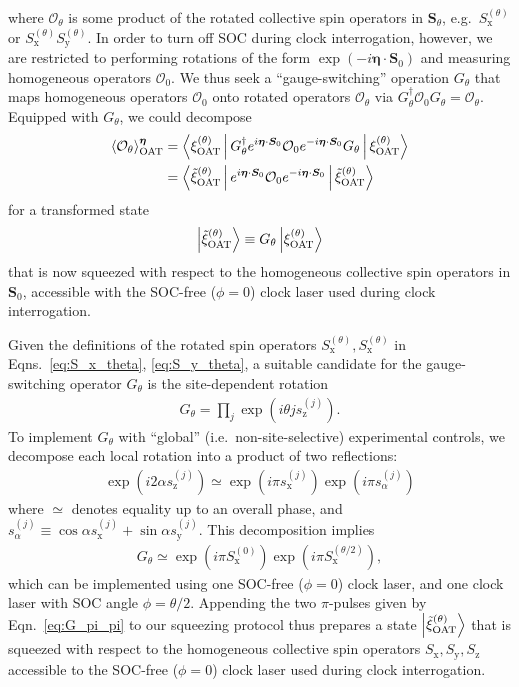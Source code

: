 \documentclass[aps,prx,superscriptaddress,notitlepage,twocolumn,longbibliography]{revtex4-1}
\renewcommand{\t}{\text} %
\newcommand{\p}[1]{\left(#1\right)} %
\renewcommand{\c}{\cdot} %
\renewcommand{\v}{\bm} %
\newcommand{\bk}{\Braket}
\renewcommand{\ket}{\Ket}
\renewcommand{\O}{\mathcal{O}}
\newcommand{\z}{\text{z}}
\newcommand{\x}{\text{x}}
\newcommand{\y}{\text{y}}
\begin{document}
where $\O_\theta$ is some product of the rotated collective spin operators in $\v S_\theta$, e.g.~$S_\x^{(\theta)}$ or $S_\x^{(\theta)} S_\y^{(\theta)}$.
In order to turn off SOC during clock interrogation, however, we are restricted to performing rotations of the form $\exp\p{-i\v\eta\c\v S_0}$ and measuring homogeneous operators $\O_0$.
We thus seek a ``gauge-switching'' operation $G_\theta$ that maps homogeneous operators $\O_0$ onto rotated operators $\O_\theta$ via $G_\theta^\dag \O_0 G_\theta = \O_\theta$.
Equipped with $G_\theta$, we could decompose
\begin{align}
  \bk{\O_\theta}_{\t{OAT}}^{\v\eta}
  &= \bk{\xi_{\t{OAT}}^{(\theta)}| G_\theta^\dag e^{i\v\eta\c\v S_0}
    \O_0 e^{-i\v\eta\c\v S_0} G_\theta |\xi_{\t{OAT}}^{(\theta)}}
  \notag \\
  &= \bk{\tilde \xi_{\t{OAT}}^{(\theta)}| e^{i\v\eta\c\v S_0}
    \O_0 e^{-i\v\eta\c\v S_0} |\tilde \xi_{\t{OAT}}^{(\theta)}}
\end{align}
for a transformed state
\begin{align}
  \ket{\tilde \xi_{\t{OAT}}^{(\theta)}}
  \equiv G_\theta \ket{\xi_{\t{OAT}}^{(\theta)}}
\end{align}
that is now squeezed with respect to the homogeneous collective spin operators in $\v S_0$, accessible with the SOC-free ($\phi=0$) clock laser used during clock interrogation.

Given the definitions of the rotated spin operators $S_\x^{(\theta)},S_\x^{(\theta)}$ in Eqns.~\eqref{eq:S_x_theta}, \eqref{eq:S_y_theta}, a suitable candidate for the gauge-switching operator $G_\theta$ is the site-dependent rotation
\begin{align}
  G_\theta = \prod_j \exp\p{i\theta j s_\z^{(j)}}.
\end{align}
To implement $G_\theta$ with ``global'' (i.e.~non-site-selective) experimental controls, we decompose each local rotation into a product of two reflections:
\begin{align}
  \exp\p{i2\alpha s_\z^{(j)}}
  \simeq \exp\p{i\pi s_\x^{(j)}} \exp\p{i\pi s_\alpha^{(j)}}
\end{align}
where $\simeq$ denotes equality up to an overall phase, and $s_\alpha^{(j)} \equiv \cos\alpha s_\x^{(j)} + \sin\alpha s_\y^{(j)}$.
This decomposition implies
\begin{align}
  G_\theta \simeq \exp\p{i\pi S_\x^{(0)}} \exp\p{i\pi S_\x^{(\theta/2)}},
  \label{eq:G_pi_pi}
\end{align}
which can be implemented using one SOC-free ($\phi=0$) clock laser, and one clock laser with SOC angle $\phi=\theta/2$.
Appending the two $\pi$-pulses given by Eqn.~\eqref{eq:G_pi_pi} to our squeezing protocol thus prepares a state $\ket{\tilde\xi_{\t{OAT}}^{(\theta)}}$ that is squeezed with respect to the homogeneous collective spin operators $S_\x,S_\y,S_\z$ accessible to the SOC-free ($\phi=0$) clock laser used during clock interrogation.
\end{document}
